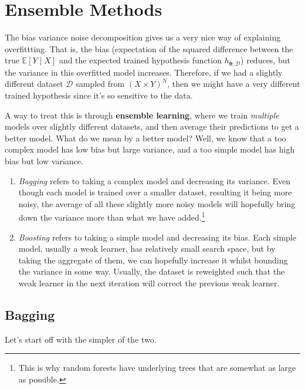 \section{Ensemble Methods}

    The bias variance noise decomposition gives us a very nice way of explaining overfittting. That is, the bias (expectation of the squared difference between the true $\mathbb{E}[Y \mid X]$ and the expected trained hypothesis function $h_{\boldsymbol{\theta}; \mathcal{D}}$) reduces, but the variance in this overfitted model increases. Therefore, if we had a slightly different dataset $\mathcal{D}$ sampled from $(X \times Y)^N$, then we might have a very different trained hypothesis since it's so sensitive to the data. 

    A way to treat this is through \textbf{ensemble learning}, where we train \textit{multiple} models over slightly different datasets, and then average their predictions to get a better model. What do we mean by a better model? Well, we know that a too complex model has low bias but large variance, and a too simple model has high bias but low variance. 

    \begin{enumerate}
      \item \textit{Bagging} refers to taking a complex model and decreasing its variance. Even though each model is trained over a smaller dataset, resulting it being more noisy, the average of all these slightly more noisy models will hopefully bring down the variance more than what we have added.\footnote{This is why random forests have underlying trees that are somewhat as large as possible.} 
      \item \textit{Boosting} refers to taking a simple model and decreasing its bias. Each simple model, usually a weak learner, has relatively small search space, but by taking the aggregate of them, we can hopefully increase it whilst bounding the variance in some way. Usually, the dataset is reweighted such that the weak learner in the next iteration will correct the previous weak learner. 
    \end{enumerate}

  \subsection{Bagging}

    Let's start off with the simpler of the two. 

